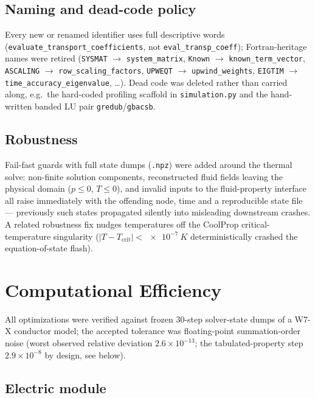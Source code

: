 \documentclass[11pt,a4paper]{article}
\newcommand{\code}[1]{\texttt{#1}}
\begin{document}
\subsection{Naming and dead-code policy}

Every new or renamed identifier uses full descriptive words
(\code{evaluate\_transport\_coefficients}, not \code{eval\_transp\_coeff});
Fortran-heritage names were retired (\code{SYSMAT} $\to$ \code{system\_matrix},
\code{Known} $\to$ \code{known\_term\_vector},
\code{ASCALING} $\to$ \code{row\_scaling\_factors},
\code{UPWEQT} $\to$ \code{upwind\_weights}, \code{EIGTIM} $\to$ 
\code{time\_accuracy\_eigenvalue}, \ldots). Dead code was deleted rather than carried
along, e.g.\ the hard-coded profiling scaffold in \code{simulation.py} and the
hand-written banded LU pair \code{gredub}/\code{gbacsb}.

\subsection{Robustness}

Fail-fast guards with full state dumps (\code{.npz}) were added around the thermal
solve: non-finite solution components, reconstructed fluid fields leaving the physical
domain ($p \le 0$, $T \le 0$), and invalid inputs to the fluid-property interface all
raise immediately with the offending node, time and a reproducible state file ---
previously such states propagated silently into misleading downstream crashes.
A related robustness fix nudges temperatures off the CoolProp critical-temperature
singularity ($|T - T_\mathrm{crit}| < \SI{e-7}{K}$ deterministically crashed the
equation-of-state flash).

\section{Computational Efficiency}
\label{sec:efficiency}

All optimizations were verified against frozen 30-step solver-state dumps of a
W7-X conductor model; the accepted tolerance was floating-point summation-order noise
(worst observed relative deviation $2.6\times10^{-13}$; the tabulated-property step
$2.9\times10^{-8}$ by design, see below).

\subsection{Electric module}
\end{document}
